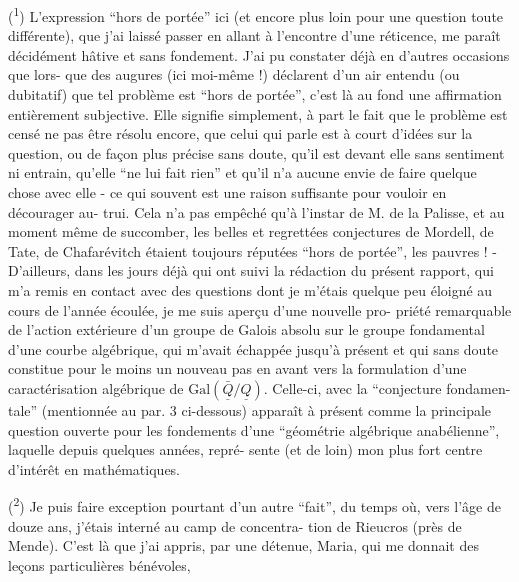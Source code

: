 
(\textsuperscript{1}) L'expression ``hors de portée'' ici (et encore plus loin pour
une question toute différente), que j'ai laissé passer en allant
à l'encontre d'une réticence, me paraît décidément hâtive et sans
fondement. J'ai pu constater déjà en d'autres occasions que lors-%
que des augures (ici moi-même !) déclarent d'un air entendu
(ou dubitatif) que tel problème est ``hors de portée'', c'est là
au fond une affirmation entièrement subjective. Elle signifie
simplement, à part le fait que le problème est censé ne pas être
résolu encore, que celui qui parle est à court d'idées sur la
question, ou de façon plus précise sans doute, qu'il est devant
elle sans sentiment ni entrain, qu'elle ``ne lui fait rien'' et
qu'il n'a aucune envie de faire quelque chose avec elle - ce qui
souvent est une raison suffisante pour vouloir en décourager au-%
trui. Cela n'a pas empêché qu'à l'instar de M. de la Palisse, et
au moment même de succomber, les belles et regrettées conjectures
de Mordell, de Tate, de Chafarévitch étaient toujours réputées
``hors de portée'', les pauvres ! - D'ailleurs, dans les jours déjà
qui ont suivi la rédaction du présent rapport, qui m'a remis en
contact avec des questions dont je m'étais quelque peu éloigné au
cours de l'année écoulée, je me suis aperçu d'une nouvelle pro-%
priété remarquable de l'action extérieure d'un groupe de Galois
absolu sur le groupe fondamental d'une courbe algébrique, qui m'avait
échappée jusqu'à présent et qui sans doute constitue pour le moins
un nouveau pas en avant vers la formulation d'une caractérisation
algébrique de $\mathrm{Gal}(\bar{\underline{Q}}/\underline{Q})$. Celle-ci, avec la ``conjecture fondamen-%
tale'' (mentionnée au par. 3 ci-dessous) apparaît à présent comme
la principale question ouverte pour les fondements d'une ``géométrie
algébrique anabélienne'', laquelle depuis quelques années, repré-%
sente (et de loin) mon plus fort centre d'intérêt en mathématiques.

(\textsuperscript{2}) Je puis faire exception pourtant d'un autre ``fait'', du temps
où, vers l'âge de douze ans, j'étais interné au camp de concentra-%
tion de Rieucros (près de Mende). C'est là que j'ai appris, par une
détenue, Maria, qui me donnait des leçons particulières bénévoles,

